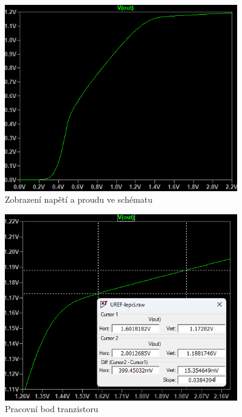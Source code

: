 \begin{figure}[h!]
    \centering
    \includegraphics[width=0.9\textwidth]{text/img/LPR_zavislost.png}
    \caption{\label{fig:LNR-zav} Zobrazení napětí a proudu ve schématu}
\end{figure}

\vspace{10mm}
\begin{figure}[h!]
    \centering
    \includegraphics[width=0.9\textwidth]{text/img/LPR-detail_zavislosti.png}
    \caption{\label{fig:LNR-det-zav} Pracovní bod tranzistoru}
\end{figure}

